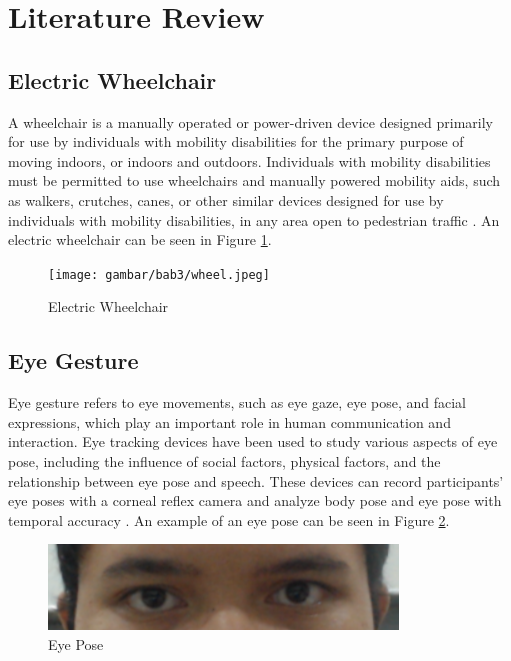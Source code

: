 \section{Literature Review}
\label{sec:relatedworks}

\subsection{Electric Wheelchair}
A wheelchair is a manually operated or power-driven device designed primarily for use by individuals with mobility disabilities for the primary purpose of moving indoors, or indoors and outdoors.  Individuals with mobility disabilities must be permitted to use wheelchairs and manually powered mobility aids, such as walkers, crutches, canes, or other similar devices designed for use by individuals with mobility disabilities, in any area open to pedestrian traffic \cite{ADA_2023}. An electric wheelchair can be seen in Figure \ref{fig:kursiroda}.

\begin{figure}[ht]
  \centering

  \texttt{[image: gambar/bab3/wheel.jpeg]}

  \caption{Electric Wheelchair}
  \label{fig:kursiroda}
\end{figure}

\subsection{Eye Gesture}

Eye gesture refers to eye movements, such as eye gaze, eye pose, and facial expressions, which play an important role in human communication and interaction. Eye tracking devices have been used to study various aspects of eye pose, including the influence of social factors, physical factors, and the relationship between eye pose and speech. These devices can record participants' eye poses with a corneal reflex camera and analyze body pose and eye pose with temporal accuracy \cite{gullberg_kita_2009}. An example of an eye pose can be seen in Figure \ref{fig:gaze}.

\begin{figure} [ht] \centering
    \includegraphics[scale=0.5]{gambar/bab3/gaze.png}
    \caption{Eye Pose}
    \label{fig:gaze}
\end{figure}

